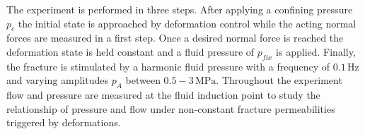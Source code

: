 The experiment is performed in three steps. After applying a confining pressure $p_{c}$ the initial state is approached by deformation control while the acting normal forces are measured in a first step. Once a desired normal force is reached the deformation state is held constant and a fluid pressure of $p_{fix}$ is applied. Finally, the fracture is stimulated by a harmonic fluid pressure with a frequency of $0.1 \, \text{Hz}$ and varying amplitudes $p_A$ between $0.5-3 \, \text{MPa}$. Throughout the experiment flow and pressure are measured at the fluid induction point to study the relationship of pressure and flow under non-constant fracture permeabilities triggered by deformations.
